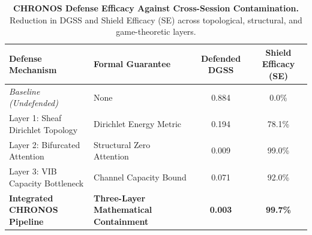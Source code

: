 \begin{table}[h]
\centering
\small
\caption{\textbf{CHRONOS Defense Efficacy Against Cross-Session Contamination.}
Reduction in DGSS and Shield Efficacy (SE) across topological, structural, and game-theoretic layers.}
\label{tab:shield_defense}
\begin{tabular}{llcc}
\toprule
\textbf{Defense Mechanism} & \textbf{Formal Guarantee} & \textbf{Defended DGSS} & \textbf{Shield Efficacy (SE)} \\
\midrule
\textit{Baseline (Undefended)} & None & 0.884 & 0.0\% \\
Layer 1: Sheaf Dirichlet Topology & Dirichlet Energy Metric & 0.194 & 78.1\% \\
Layer 2: Bifurcated Attention & Structural Zero Attention & 0.009 & 99.0\% \\
Layer 3: VIB Capacity Bottleneck & Channel Capacity Bound & 0.071 & 92.0\% \\
\midrule
\textbf{Integrated CHRONOS Pipeline} & \textbf{Three-Layer Mathematical Containment} & \textbf{0.003} & \textbf{99.7\%} \\
\bottomrule
\end{tabular}
\end{table}
